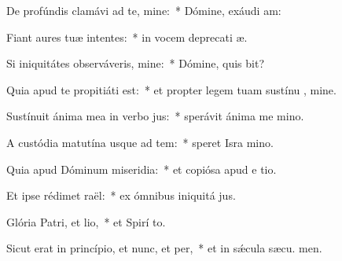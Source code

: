 \item De profúndis clamávi ad te, mine:~* Dómine, exáudi  am:
\item Fiant aures tuæ intentes:~* in vocem deprecati æ.
\item Si iniquitátes observáveris, mine:~* Dómine, quis bit?
\item Quia apud te propitiáti est:~* et propter legem tuam sustínu , mine.
\item Sustínuit ánima mea in verbo jus:~* sperávit ánima me  mino.
\item A custódia matutína usque ad tem:~* speret Isra  mino.
\item Quia apud Dóminum miseridia:~* et copiósa apud e tio.
\item Et ipse rédimet raël:~* ex ómnibus iniquitá jus.
\item Glória Patri, et lio,~* et Spirí to.
\item Sicut erat in princípio, et nunc, et per,~* et in sǽcula sæcu. men.
